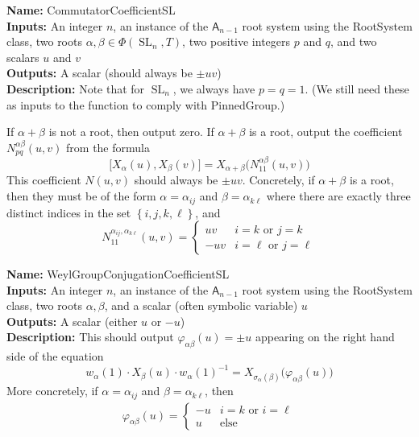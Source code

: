 \documentclass[12pt]{article}
\theoremstyle{definition}
\numberwithin{theorem}{subsection}
\newcommand{\sig}{\sigma}
\newcommand{\lb}{\left\{}
\newcommand{\rb}{\right\}}
\newcommand{\tbf}{\textbf}
\newcommand{\noi}{\noindent}
\newcommand{\inv}{^{-1}}
\DeclareMathOperator{\SL}{SL}
\begin{document}
\begin{framed}
\noi \tbf{Name:} CommutatorCoefficientSL \\
\noi \tbf{Inputs:} An integer $n$, an instance of the $\mathsf{A}_{n-1}$ root system using the RootSystem class, two roots $\alpha, \beta \in \Phi(\SL_n, T)$, two positive integers $p$ and $q$, and two scalars $u$ and $v$ \\
\noi \tbf{Outputs:} A scalar (should always be $\pm uv$) \\
\noi \tbf{Description:} Note that for $\SL_n$, we always have $p=q=1$. (We still need these as inputs to the function to comply with PinnedGroup.) 

If $\alpha + \beta$ is not a root, then output zero. If $\alpha + \beta$ is a root, output the coefficient $N_{pq}^{\alpha \beta}(u,v)$ from the formula
\[
	\Big[ X_\alpha(u), X_\beta(v) \Big] = X_{\alpha+\beta} \Big( N_{11}^{\alpha \beta}(u,v) \Big)
\]
This coefficient $N(u,v)$ should always be $\pm uv$. Concretely, if $\alpha + \beta$ is a root, then they must be of the form $\alpha = \alpha_{ij}$ and $\beta = \alpha_{k \ell}$ where there are exactly three distinct indices in the set $\lb i,j,k, \ell \rb$, and
\[
	N_{11}^{\alpha_{ij}, \alpha_{k\ell}}(u,v) =
	\begin{cases}
		uv & i=k \text{ or } j = k \\
		-uv & i = \ell \text{ or } j = \ell
	\end{cases}
\]
\end{framed}


\begin{framed}
\noi \tbf{Name:} WeylGroupConjugationCoefficientSL \\
\noi \tbf{Inputs:} An integer $n$, an instance of the $\mathsf{A}_{n-1}$ root system using the RootSystem class, two roots $\alpha,\beta$, and a scalar (often symbolic variable) $u$ \\
\noi \tbf{Outputs:} A scalar (either $u$ or $-u$) \\
\noi \tbf{Description:} This should output $\varphi_{\alpha \beta}( u ) = \pm u$ appearing on the right hand side of the equation
\[
	w_\alpha(1) \cdot X_\beta(u) \cdot w_\alpha(1) \inv = X_{\sig_\alpha(\beta)} \Big( \varphi_{\alpha \beta}( u ) \Big)
\]
More concretely, if $\alpha = \alpha_{ij}$ and $\beta = \alpha_{k \ell}$, then
\begin{align*}
	\varphi_{\alpha \beta}( u ) = 
	\begin{cases}
		-u & i = k \text{ or } i = \ell \\
		u & \text{else}
	\end{cases}
\end{align*}
\end{framed}
\end{document}
